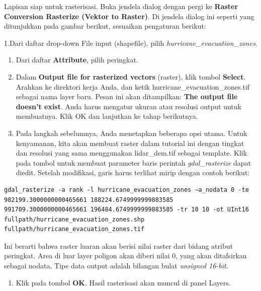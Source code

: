 \documentclass[]{book}
\providecommand{\tightlist}{%
  \setlength{\itemsep}{0pt}\setlength{\parskip}{0pt}}
\begin{document}
Lapisan siap untuk rasterisasi. Buka jendela dialog dengan pergi ke \textbf{Raster \textbar{} Conversion \textbar{} Rasterize (Vektor to Raster)}. Di jendela dialog ini seperti yang ditunjukkan pada gambar berikut, sesuaikan pengaturan berikut:

1.Dari daftar drop-down File input (shapefile), pilih \emph{hurricane\_evacuation\_zones}.

\begin{enumerate}
\def\labelenumi{\arabic{enumi}.}
\setcounter{enumi}{1}
\item
  Dari daftar \textbf{Attribute}, pilih peringkat.
\item
  Dalam \textbf{Output file for rasterized vectors} (raster), klik tombol \textbf{Select}. Arahkan ke direktori kerja Anda, dan ketik hurricane\_evacuation\_zones.tif sebagai nama layer baru. Pesan ini akan ditampilkan: \textbf{The output file doesn't exist}. Anda harus mengatur ukuran atau resolusi output untuk membuatnya. Klik OK dan lanjutkan ke tahap berikutnya.
\item
  Pada langkah sebelumnya, Anda menetapkan beberapa opsi utama. Untuk kenyamanan, kita akan membuat raster dalam tutorial ini dengan tingkat dan resolusi yang sama menggunakan lidar\_dem.tif sebagai template. Klik pada tombol untuk membuat parameter baris perintah \emph{gdal\_rasterize} dapat diedit. Setelah modifikasi, garis harus terlihat mirip dengan contoh berikut:
\end{enumerate}

\begin{verbatim}
gdal_rasterize -a rank -l hurricane_evacuation_zones –a_nodata 0 -te 982199.3000000000465661 188224.6749999999883585 991709.3000000000465661 196484.6749999999883585 -tr 10 10 -ot UInt16 fullpath/hurricane_evacuation_zones.shp fullpath/hurricane_evacuation_zones.tif
\end{verbatim}

Ini berarti bahwa raster luaran akan berisi nilai raster dari bidang atribut peringkat. Area di luar layer poligon akan diberi nilai 0, yang akan ditafsirkan sebagai nodata. Tipe data output adalah bilangan bulat \emph{unsigned 16-bit}.

\begin{enumerate}
\def\labelenumi{\arabic{enumi}.}
\setcounter{enumi}{4}
\tightlist
\item
  Klik pada tombol \textbf{OK}. Hasil rasterisasi akan muncul di panel Layers.
\end{enumerate}
\end{document}
